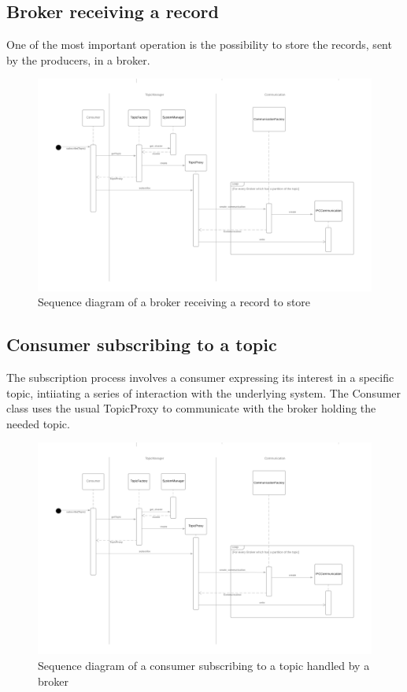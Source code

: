 \subsection{Broker receiving a record}

One of the most important operation is the possibility to store the records,
sent by the producers, in a broker. 

\begin{figure}[H]
    \centering
    \includegraphics[width=1.0\textwidth]{Figures/sequence_diagram_broker.png}
    \caption{Sequence diagram of a broker receiving a record to store}
\end{figure}

\subsection{Consumer subscribing to a topic}

The subscription process involves a consumer expressing its interest in a
specific topic, intiiating a series of interaction with the underlying system.
The Consumer class uses the usual TopicProxy to communicate with the broker
holding the needed topic.

\begin{figure}[H]
    \centering
    \includegraphics[width=1.0\textwidth]{Figures/sequence_diagram_subscription.png}
    \caption{Sequence diagram of a consumer subscribing to a topic handled by
             a broker}
\end{figure}


